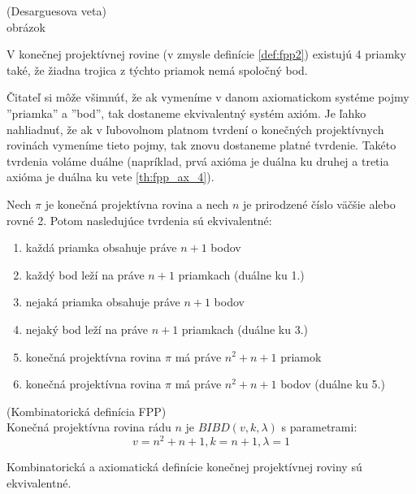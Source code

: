 \begin{theorem_hard}{(Desarguesova veta)}\\
\TODO obrázok
\end{theorem_hard}


\begin{theorem}
\label{th:fpp_ax_4}
V konečnej projektívnej rovine (v zmysle definície \ref{def:fpp2}) existujú 4 priamky také,
že žiadna trojica z týchto priamok nemá spoločný bod.
\end{theorem}

Čitateľ si môže všimnúť, že ak vymeníme v danom axiomatickom systéme pojmy ''priamka'' a ''bod'',
tak dostaneme ekvivalentný systém axióm. Je ľahko nahliadnuť, 
že ak v ľubovolnom platnom tvrdení o konečných projektívnych rovinách vymeníme tieto pojmy, tak
znovu dostaneme platné tvrdenie. Takéto tvrdenia voláme duálne (napríklad, prvá axióma je duálna ku druhej a tretia axióma
je duálna ku vete \ref{th:fpp_ax_4}).

\begin{theorem}
Nech $\pi$ je konečná projektívna rovina 
a nech $n$ je prirodzené 
číslo väčšie alebo rovné 2. 
Potom nasledujúce tvrdenia sú ekvivalentné:
\begin{enumerate}
    \item každá priamka obsahuje práve $n+1$ bodov
    \item každý bod leží na práve $n+1$ priamkach (duálne ku 1.)
    \item nejaká priamka obsahuje práve $n+1$ bodov
    \item nejaký bod leží na práve $n+1$ priamkach (duálne ku 3.)
    \item konečná projektívna rovina $\pi$ má práve $n^2+n+1$ priamok
    \item konečná projektívna rovina $\pi$ má práve $n^2+n+1$ bodov (duálne ku 5.)
\end{enumerate}
\end{theorem}


\begin{definition}{(Kombinatorická definícia FPP)}\\
Konečná projektívna rovina rádu $n$ je $BIBD(v, k, \lambda)$ s parametrami:
$$v = n^2 + n + 1, k = n + 1, \lambda = 1$$
\end{definition}

\begin{theorem}
Kombinatorická a axiomatická definície konečnej projektívnej roviny sú ekvivalentné. 
\end{theorem}

